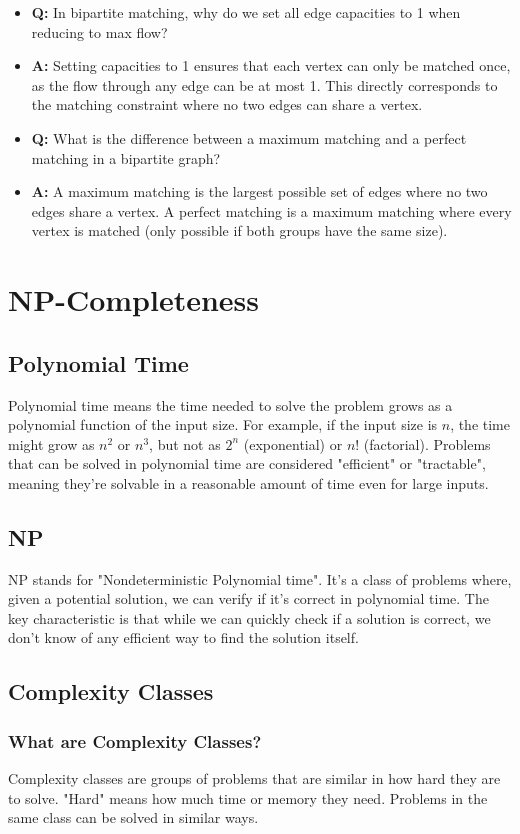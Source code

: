 \documentclass[11pt,a4paper]{article}
\begin{document}
\begin{multicols}{2}
\begin{itemize}
    \item \textbf{Q:} In bipartite matching, why do we set all edge capacities to 1 when reducing to max flow?
    \item \textbf{A:} Setting capacities to 1 ensures that each vertex can only be matched once, as the flow through any edge can be at most 1. This directly corresponds to the matching constraint where no two edges can share a vertex.

    \item \textbf{Q:} What is the difference between a maximum matching and a perfect matching in a bipartite graph?
    \item \textbf{A:} A maximum matching is the largest possible set of edges where no two edges share a vertex. A perfect matching is a maximum matching where every vertex is matched (only possible if both groups have the same size).
\end{itemize}

\section{NP-Completeness}
\subsection{Polynomial Time}
Polynomial time means the time needed to solve the problem grows as a polynomial function of the input size.
For example, if the input size is $n$, the time might grow as $n^2$ or $n^3$, but not as $2^n$ (exponential) or $n!$ (factorial).
Problems that can be solved in polynomial time are considered "efficient" or "tractable", meaning they're solvable in a reasonable amount of time even for large inputs.

\subsection{NP}
NP stands for "Nondeterministic Polynomial time".
It's a class of problems where, given a potential solution, we can verify if it's correct in polynomial time.
The key characteristic is that while we can quickly check if a solution is correct, we don't know of any efficient way to find the solution itself.
\subsection{Complexity Classes}
\subsubsection{What are Complexity Classes?}
Complexity classes are groups of problems that are similar in how hard they are to solve. "Hard" means how much time or memory they need. Problems in the same class can be solved in similar ways.


\end{multicols}
\end{document}
